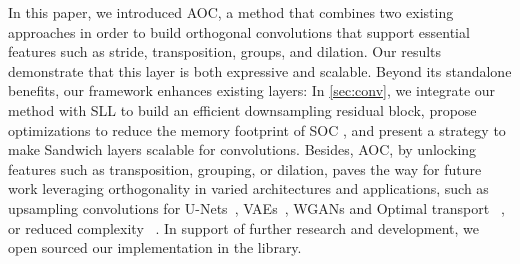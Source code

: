 %
In this paper, we introduced AOC, a method that combines two existing approaches in order to build orthogonal convolutions that support essential features such as stride, transposition, groups, and dilation. Our results demonstrate that this layer is both expressive and scalable.
%
Beyond its standalone benefits, our framework enhances existing layers: In \cref{sec:conv}, we integrate our method with SLL \cite{araujo_unified_2023} to build an efficient downsampling residual block, propose optimizations to reduce the memory footprint of SOC \cite{singla_fantastic_2021}, and present a strategy to make Sandwich layers \cite{wang_direct_2023} scalable for convolutions.
%
Besides, AOC, by unlocking features such as transposition, grouping, or dilation, paves the way for future work leveraging orthogonality in varied architectures and applications, such as upsampling convolutions for U-Nets~\cite{ronneberger2015u}, VAEs~\cite{kingma2013auto},  WGANs and Optimal transport ~\cite{arjovsky2017wasserstein,bethune2024deep}, or reduced complexity ~\cite{li2018csrnet,xie2017aggregated}. 
In support of further research and development, we open sourced our implementation in the \fulllibname{} library.


%
\label{sec:conclusions}
